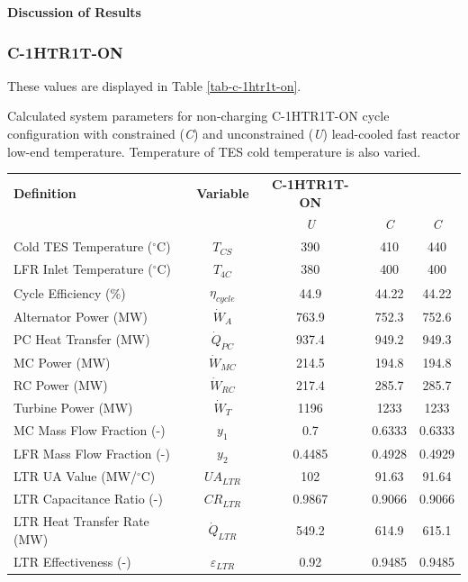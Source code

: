 \begin{paracol}{2}
\textbf{Discussion of Results}


\subsubsection{C-1HTR1T-ON}

These values are displayed in Table \ref{tab-c-1htr1t-on}.

\begin{specialtable}[H] 
    \caption{Calculated system parameters for non-charging C-1HTR1T-ON cycle configuration with constrained (\textit{C}) and unconstrained (\textit{U}) lead-cooled fast reactor low-end temperature. Temperature of TES cold temperature is also varied.\label{tab-c-1htr1t-on}}
    \begin{tabular}{lcccc}
    \toprule
    \textbf{Definition} & \textbf{Variable} & \textbf{C-1HTR1T-ON}\\
    & & \textit{U} & \textit{C} & \textit{C}\\
    \midrule	
    Cold TES Temperature ($^{\circ}$C)	&	$T_{CS}$	&	390	&	410	&	440	\\
    LFR Inlet Temperature ($^{\circ}$C)	&	$T_{4C}$	&	380	&	400	&	400	\\
    Cycle Efficiency (\%)	&	$\eta_{cycle}$	&	44.9	&	44.22	&	44.22	\\
    Alternator Power (MW)	&	$\dot{W}_{A}$	&	763.9	&	752.3	&	752.6	\\
    PC Heat Transfer (MW)	&	$\dot{Q}_{PC}$	&	937.4	&	949.2	&	949.3	\\
    MC Power (MW)	&	$\dot{W}_{MC}$	&	214.5	&	194.8	&	194.8	\\
    RC Power (MW)	&	$\dot{W}_{RC}$	&	217.4	&	285.7	&	285.7	\\
    Turbine Power (MW)	&	$\dot{W}_{T}$	&	1196	&	1233	&	1233	\\
    MC Mass Flow Fraction (-)	&	$y_{1}$	&	0.7	&	0.6333	&	0.6333	\\
    LFR Mass Flow Fraction (-)	&	$y_{2}$	&	0.4485	&	0.4928	&	0.4929	\\
    LTR UA Value (MW/$^{\circ}$C)	&	$UA_{LTR}$	&	102	&	91.63	&	91.64	\\
    LTR Capacitance Ratio (-)	&	$CR_{LTR}$	&	0.9867	&	0.9066	&	0.9066	\\
    LTR Heat Transfer Rate (MW)	&	$\dot{Q}_{LTR}$	&	549.2	&	614.9	&	615.1	\\
    LTR Effectiveness (-)	&	$\varepsilon_{LTR}$	&	0.92	&	0.9485	&	0.9485	\\

\end{tabular}
\end{specialtable}
\end{paracol}
